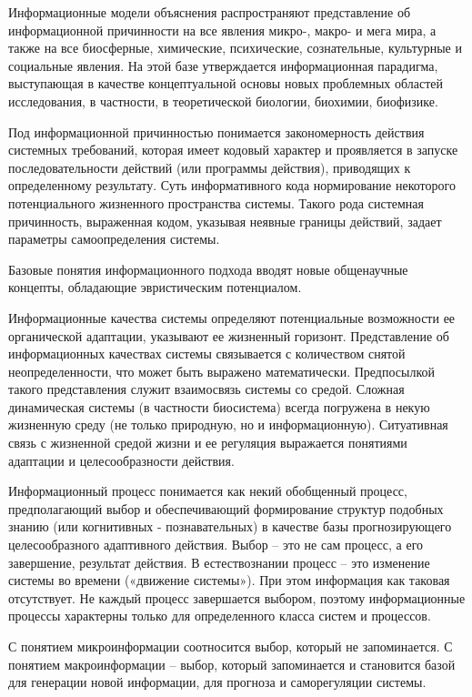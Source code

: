 \documentclass[exam_answers.tex]{subfiles}
\begin{document}
Информационные модели объяснения распространяют представление об
информационной причинности на все явления микро-, макро- и мега мира, а
также на все биосферные, химические, психические, сознательные, культурные
и социальные явления. На этой базе утверждается информационная парадигма,
выступающая в качестве концептуальной основы новых проблемных областей
исследования, в частности, в теоретической биологии, биохимии, биофизике.

Под информационной причинностью понимается закономерность действия
системных требований, которая имеет кодовый характер и проявляется в
запуске последовательности действий (или программы действия), приводящих
к определенному результату. Суть информативного кода нормирование
некоторого потенциального жизненного пространства системы. Такого рода
системная причинность, выраженная кодом, указывая неявные границы
действий, задает параметры самоопределения системы.

Базовые понятия информационного подхода вводят новые общенаучные
концепты, обладающие эвристическим потенциалом.

Информационные качества системы определяют потенциальные
возможности ее органической адаптации, указывают ее жизненный горизонт.
Представление об информационных качествах системы связывается с
количеством снятой неопределенности, что может быть выражено
математически. Предпосылкой такого представления служит взаимосвязь
системы со средой. Сложная динамическая системы (в частности биосистема)
всегда погружена в некую жизненную среду (не только природную, но и
информационную). Ситуативная связь с жизненной средой жизни и ее
регуляция выражается понятиями адаптации и целесообразности действия.

Информационный процесс понимается как некий обобщенный процесс,
предполагающий выбор и обеспечивающий формирование структур подобных
знанию (или когнитивных - познавательных) в качестве базы прогнозирующего
целесообразного адаптивного действия. Выбор – это не сам процесс, а его
завершение, результат действия. В естествознании процесс – это изменение
системы во времени («движение системы»). При этом информация как таковая
отсутствует. Не каждый процесс завершается выбором, поэтому
информационные процессы характерны только для определенного класса
систем и процессов.

С понятием микроинформации соотносится выбор, который не
запоминается. С понятием макроинформации – выбор, который запоминается и
становится базой для генерации новой информации, для прогноза и
саморегуляции системы.
\end{document}
